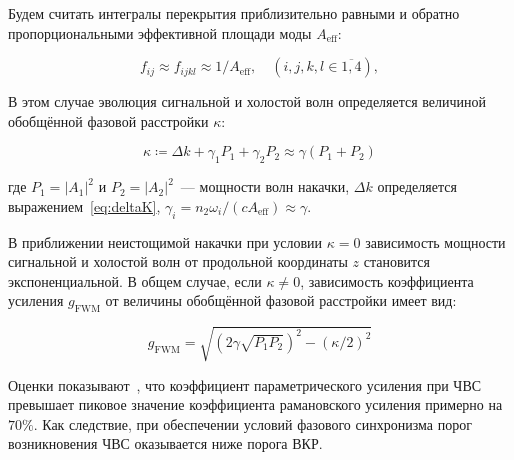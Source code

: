 Будем считать интегралы перекрытия приблизительно равными и обратно пропорциональными эффективной площади моды \(A_{\text{eff}}\):

\begin{equation}
	f_{ij} \approx f_{ijkl} \approx 1/A_{\text{eff}},\quad \left(i,j,k,l \in \overline{1,4} \right),
	\label{eq:f_ij_ijkl_same}
\end{equation}


В этом случае эволюция сигнальной и холостой волн определяется величиной обобщённой фазовой расстройки $\kappa$:

\begin{equation}
	\kappa \coloneqq \Delta k  + \gamma_1 P_1 + \gamma_2 P_2 \approx \gamma\left(P_1 + P_2\right)
	\label{eq:nondepleted_phase_sync}
\end{equation}

где \(P_1 = |A_1|^2\) и \(P_2 = |A_2|^2\)~--- мощности волн накачки, \(\Delta k\) определяется выражением~\cref{eq:deltaK}, \(\gamma_i = n_2 \omega_i / (c A_{\text{eff}})\approx \gamma\).

В приближении неистощимой накачки при условии $\kappa=0$ зависимость мощности сигнальной и холостой волн от продольной координаты \(z\) становится экспоненциальной. В общем случае, если  $\kappa\neq0$, зависимость коэффициента усиления $g_{\text{FWM}}$ от величины обобщённой фазовой расстройки имеет вид:

\begin{equation}
	g_{\text{FWM}}=\sqrt{\left(2\gamma\sqrt{P_1 P_2}\right)^2-\left(\kappa/2\right)^2}
	\label{eq:gain_fwm}
\end{equation}

Оценки показывают~\cite{agrawal2019}, что коэффициент параметрического усиления при ЧВС превышает пиковое значение коэффициента рамановского усиления примерно на $70\%$. Как следствие, при обеспечении условий фазового синхронизма порог возникновения ЧВС оказывается  ниже порога ВКР.

